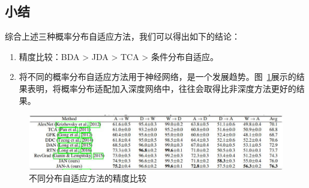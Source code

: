 \subsection{小结}

综合上述三种概率分布自适应方法，我们可以得出如下的结论：

\begin{enumerate}
	\item 精度比较：BDA > JDA > TCA > 条件分布自适应。
	\item 将不同的概率分布自适应方法用于神经网络，是一个发展趋势。图~\ref{fig-distribution-deep}展示的结果表明，将概率分布适配加入深度网络中，往往会取得比非深度方法更好的结果。
\end{enumerate}

\begin{figure}[htbp]
	\centering
	\includegraphics[scale=0.6]{./figures/fig-distribution-deep.pdf}
	\caption{不同分布自适应方法的精度比较}
	\label{fig-distribution-deep}
\end{figure}